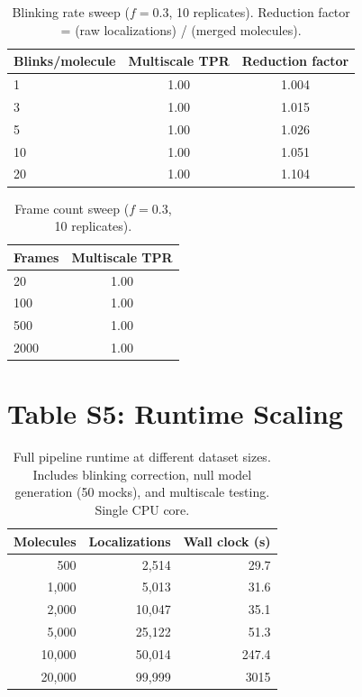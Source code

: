 \documentclass[11pt]{article}
\begin{document}
\begin{table}[ht]
\centering
\caption{Blinking rate sweep ($f = 0.3$, 10 replicates). Reduction factor
  = (raw localizations) / (merged molecules).}
\label{tab:s4_blink}
\begin{tabular}{lcc}
\toprule
Blinks/molecule & Multiscale TPR & Reduction factor \\
\midrule
1  & 1.00 & 1.004 \\
3  & 1.00 & 1.015 \\
5  & 1.00 & 1.026 \\
10 & 1.00 & 1.051 \\
20 & 1.00 & 1.104 \\
\bottomrule
\end{tabular}
\end{table}

\begin{table}[ht]
\centering
\caption{Frame count sweep ($f = 0.3$, 10 replicates).}
\label{tab:s4_frames}
\begin{tabular}{lc}
\toprule
Frames & Multiscale TPR \\
\midrule
20   & 1.00 \\
100  & 1.00 \\
500  & 1.00 \\
2000 & 1.00 \\
\bottomrule
\end{tabular}
\end{table}

\section*{Table S5: Runtime Scaling}

\begin{table}[ht]
\centering
\caption{Full pipeline runtime at different dataset sizes. Includes
  blinking correction, null model generation (50 mocks), and multiscale
  testing. Single CPU core.}
\label{tab:s5_runtime}
\begin{tabular}{rrr}
\toprule
Molecules & Localizations & Wall clock (s) \\
\midrule
500    & 2,514    & 29.7  \\
1,000  & 5,013    & 31.6  \\
2,000  & 10,047   & 35.1  \\
5,000  & 25,122   & 51.3  \\
10,000 & 50,014   & 247.4 \\
20,000 & 99,999   & 3015  \\
\bottomrule
\end{tabular}
\end{table}
\end{document}
